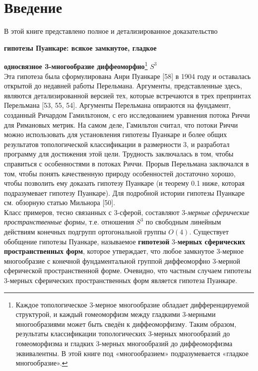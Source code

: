\section*{Введение}

В этой книге представлено полное и детализированное доказательство 

\hspace{1cm}\large\textbf{гипотезы Пуанкаре: всякое замкнутое, гладкое}

\hspace{1cm}\large\textbf{односвязное 3-многообразие диффеоморфно}\footnote{Каждое топологическое 3-мерное многообразие обладает дифференцируемой структурой, и каждый гомеоморфизм между гладкими 3-мерными многообразиями может быть сведён к диффеоморфизму. Таким образом, результаты классификации топологических 3-мерных многообразий до гомеоморфизма и гладких 3-мерных многообразий до диффеоморфизма эквивалентны. В этой книге под «многообразием» подразумевается «гладкое многообразие».} \large\textbf{$S^{3}$}\\
Эта гипотеза была сформулирована Анри Пуанкаре [58] в 1904 году и оставалась открытой 
до недавней работы Перельмана. Аргументы, представленные здесь, являются детализированной 
версией тех, которые встречаются в трех препринтах Перельмана [53, 55, 54]. 
Аргументы Перельмана опираются на фундамент, созданный Ричардом Гамильтоном, 
с его исследованием уравнения потока Риччи для Римановых метрик. 
На самом деле, Гамильтон считал, что потоки Риччи можно использовать 
для установления гипотезы Пуанкаре и более общих результатов топологической 
классификации в размерности 3, и разработал программу для достижения этой цели. 
Трудность заключалась в том, чтобы справиться с особенностями в потоках Риччи. 
Прорыв Перельмана заключался в том, чтобы понять качественную природу 
особенностей достаточно хорошо, чтобы позволить ему доказать гипотезу Пуанкаре 
(и теорему 0.1 ниже, которая подразумевает гипотезу Пуанкаре). 
Для подробной истории гипотезы Пуанкаре см. обзорную статью Мильнора [50].\\

Класс примеров, тесно связанных с 3-сферой, составляют 3-\textit{мерные сферические 
пространственные формы}, т.е. отношения $S^{3}$ по свободным линейным действиям 
конечных подгрупп ортогональной группы $O(4)$. 
Существует обобщение гипотезы Пуанкаре, называемое \textbf{гипотезой} 3-\textbf{мерных 
сферических пространственных форм}, которое утверждает, что любое замкнутое 
3-мерное многообразие с конечной фундаментальной группой диффеоморфно 
3-мерной сферической пространственной форме. Очевидно, что частным случаем 
гипотезы 3-мерных сферических пространственных форм является гипотеза Пуанкаре.


